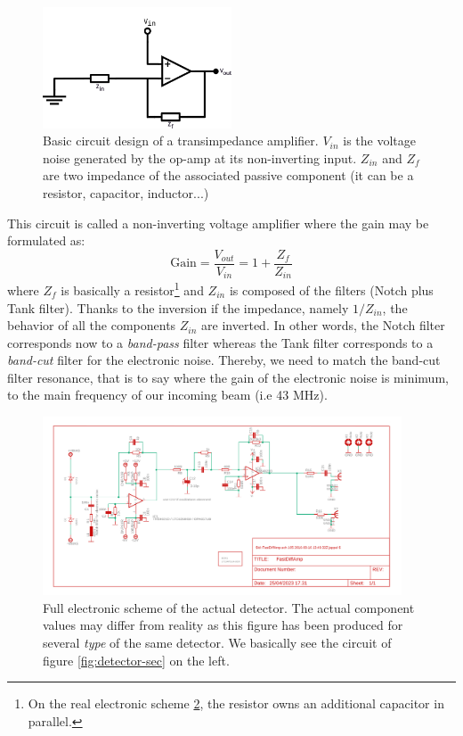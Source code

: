 \documentclass[11pt]{report}
\begin{document}
\begin{figure}[h!]
\centering
\includegraphics[width=0.5\textwidth]{transimp}
\caption{Basic circuit design of a transimpedance amplifier. $V
_{in}$ is the voltage noise generated by the op-amp at its non-inverting input. $Z_{in}$ and $Z_f$ are two impedance of the associated passive component (it can be a resistor, capacitor, inductor...)}
\label{fig:transimp}
\end{figure}

This circuit is called a non-inverting voltage amplifier where the gain may be formulated as:
\begin{equation}
\textrm{Gain} = \frac{V_{out}}{V_{in}} = 1 + \frac{Z_{f}}{Z_{in}}
\end{equation}
where $Z_f$ is basically a resistor\footnote{On the real electronic scheme \ref{fig:elec-scheme}, the resistor owns an additional capacitor in parallel.} and $Z_{in}$ is composed of the filters (Notch plus Tank filter). Thanks to the inversion if the impedance, namely $1/Z_{in}$, the behavior of all the components $Z_{in}$ are inverted. In other words, the Notch filter corresponds now to a \textit{band-pass} filter whereas the Tank filter corresponds to a \textit{band-cut} filter for the electronic noise. Thereby, we need to match the band-cut filter resonance, that is to say where the gain of the electronic noise is minimum, to the main frequency of our incoming beam (i.e 43 MHz).

\begin{figure}[h!]
\centering
\includegraphics[width=0.95\textwidth]{elec-scheme}
\caption{Full electronic scheme of the actual detector. The actual component values may differ from reality as this figure has been produced for several \textit{type} of the same detector. We basically see the circuit of figure \ref{fig:detector-sec} on the left.}
\label{fig:elec-scheme}
\end{figure}
\end{document}
